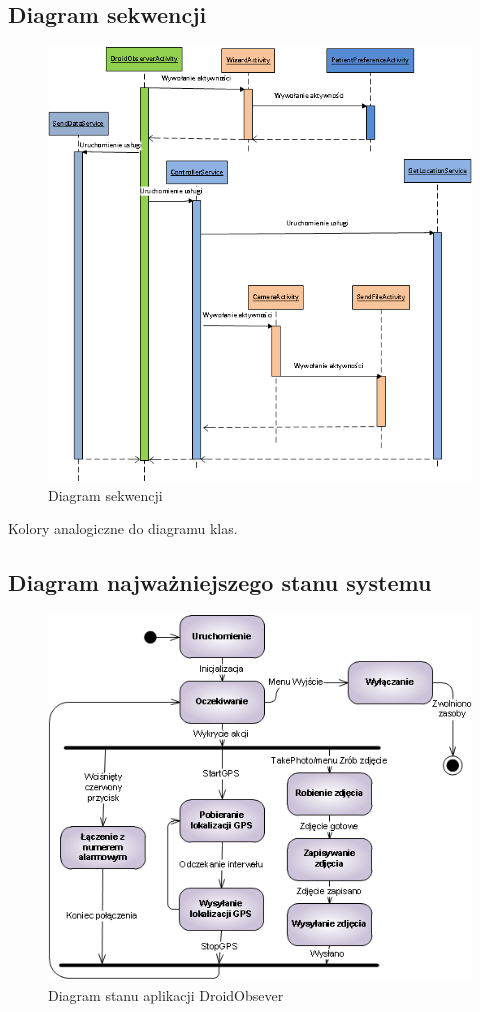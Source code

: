 \documentclass[11pt,a4paper]{article}
\begin{document}
\subsection {Diagram sekwencji}
\begin{figure}[h]
    \includegraphics[scale=0.7]{sequence.png}
    \caption{Diagram sekwencji}
 \end{figure}
Kolory analogiczne do diagramu klas.
\newpage
\subsection {Diagram najważniejszego stanu systemu}
\begin{figure}[h]
    \includegraphics[scale=0.71]{state.png}
    \caption{Diagram stanu aplikacji DroidObsever}
 \end{figure}
\end{document}
